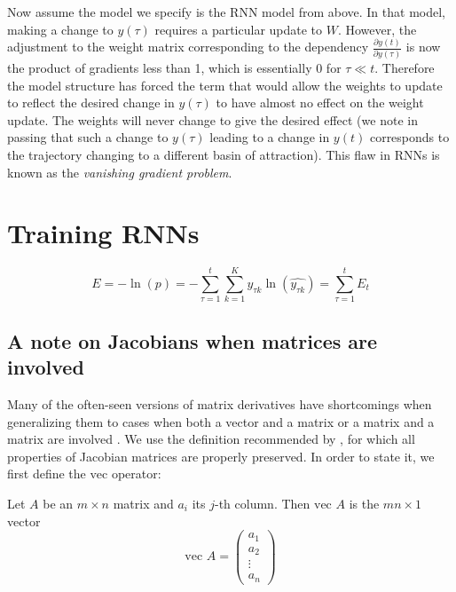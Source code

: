 Now assume the model we specify is the RNN model from above. In that model, making a change to $y(\tau)$ requires a particular update to $W$. However, the adjustment to the weight matrix corresponding to the dependency $\frac{\partial y(t)}{\partial y(\tau)}$ is now the product of gradients less than 1, which is essentially 0 for $\tau \ll t$. Therefore the model structure has forced the term that would allow the weights to update to reflect the desired change in $y(\tau)$ to have almost no effect on the weight update. The weights will never change to give the desired effect (we note in passing that such a change to $y(\tau)$ leading to a change in $y(t)$ corresponds to the trajectory changing to a different basin of attraction). This flaw in RNNs is known as the \emph{vanishing gradient problem}.

\section{Training RNNs}

\begin{equation*}
  E = -\ln(p) = -\sum_{\tau=1}^t \sum_{k=1}^K y_{\tau k} \ln\left(\widehat{y_{\tau k}}\right) = \sum_{\tau=1}^{t} E_t
\end{equation*}

\subsection{A note on Jacobians when matrices are involved}

Many of the often-seen versions of matrix derivatives have shortcomings when generalizing them to cases when both a vector and a matrix or a matrix and a matrix are involved \cite[p. 193-197]{magnus1999matrix}. We use the definition recommended by \citet{magnus1999matrix}, for which all properties of Jacobian matrices are properly preserved. In order to state it, we first define the $\mbox{vec}$ operator:

\begin{definition}
  Let $A$ be an $m \times n$ matrix and $a_i$ its $j$-th column. Then $\mbox{vec } A$ is the $mn \times 1$ vector
  \begin{equation*}
    \mbox{vec } A = \begin{pmatrix}
      a_1 \\ a_2 \\ \vdots \\ a_n
      \end{pmatrix}
  \end{equation*}
  \cite[p. 34]{magnus1999matrix}
\end{definition}

